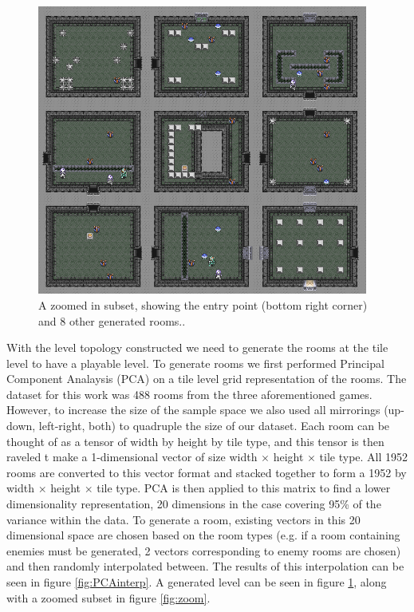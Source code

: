 \documentclass[a4paper]{article}
\begin{document}
\begin{figure}[ht]
\centering
    \includegraphics[width=0.97\textwidth]{figures/lttp1_zoom.png}
    \caption{A zoomed in subset, showing the entry point (bottom right corner) and 8 other generated rooms..}
  \label{fig:dungeon}
\end{figure}
With the level topology constructed we need to generate the rooms at the tile level to have a playable level.  To generate rooms we first performed Principal Component Analaysis (PCA) on a tile level grid representation of the rooms. The dataset for this work was 488 rooms from the three aforementioned games.  However, to increase the size of the sample space we also used all mirrorings (up-down, left-right, both) to quadruple the size of our dataset. Each room can be thought of as a tensor of width by height by tile type, and this tensor is then raveled t make a 1-dimensional vector of size width $\times$ height $\times$ tile type.  All 1952 rooms are converted to this vector format and stacked together to form a 1952 by width $\times$ height $\times$ tile type.  PCA is then applied to this matrix to find a lower dimensionality representation, 20 dimensions in the case covering 95\% of the variance within the data.  To generate a room, existing vectors in this 20 dimensional space are chosen based on the room types (e.g. if a room containing enemies must be generated, 2 vectors corresponding to enemy rooms are chosen) and then randomly interpolated between.  The results of this interpolation can be seen in figure \ref{fig:PCAinterp}. A generated level can be seen in figure \ref{fig:dungeon}, along with a zoomed subset in figure \ref{fig:zoom}.
\end{document}
